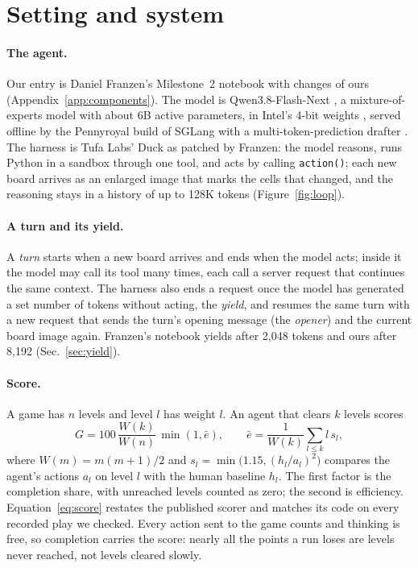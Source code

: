 \section{Setting and system}\label{sec:setting}

\paragraph{The agent.}
Our entry is Daniel Franzen's Milestone~2 notebook \citep{franzen2026milestone2,franzen2026writeup} with changes of ours (Appendix~\ref{app:components}). %
The model is Qwen3.8-Flash-Next \citep{qwen38flashnext}, a mixture-of-experts model with about 6B active parameters, in Intel's 4-bit weights \citep{intel2026w4a16}, served offline by the Pennyroyal build of SGLang \citep{pezzulli2026pennyroyal,zheng2023sglang} with a multi-token-prediction drafter \citep{albucino2026drafter}. %
The harness is Tufa Labs' Duck \citep{bessis2026duck} as patched by Franzen: the model reasons, runs Python in a sandbox through one tool, and acts by calling \texttt{action()}; each new board arrives as an enlarged image that marks the cells that changed, and the reasoning stays in a history of up to 128K tokens (Figure~\ref{fig:loop}). %

\paragraph{A turn and its yield.}
A \emph{turn} starts when a new board arrives and ends when the model acts; inside it the model may call its tool many times, each call a server request that continues the same context.
The harness also ends a request once the model has generated a set number of tokens without acting, the \emph{yield}, and resumes the same turn with a new request that sends the turn's opening message (the \emph{opener}) and the current board image again.
Franzen's notebook yields after 2,048 tokens and ours after 8,192 (Sec.~\ref{sec:yield}). %

\paragraph{Score.}
A game has $n$ levels and level $l$ has weight $l$. An agent that clears $k$ levels scores
\begin{equation}\label{eq:score}
G = 100\,\frac{W(k)}{W(n)}\,\min(1,\bar e),\qquad \bar e = \frac{1}{W(k)}\sum_{l\le k} l\,s_l,
\end{equation}
where $W(m)=m(m+1)/2$ and $s_l=\min\!\big(1.15,(h_l/a_l)^{2}\big)$ compares the agent's actions $a_l$ on level $l$ with the human baseline $h_l$. %
The first factor is the completion share, with unreached levels counted as zero; the second is efficiency.
Equation~\eqref{eq:score} restates the published scorer and matches its code on every recorded play we checked. %
Every action sent to the game counts and thinking is free, so completion carries the score: nearly all the points a run loses are levels never reached, not levels cleared slowly. %

